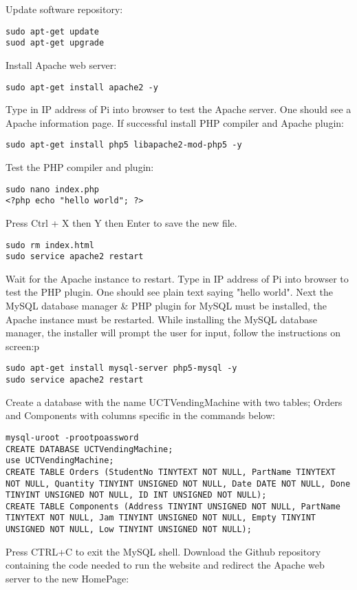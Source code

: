 \documentclass[a4paper,11pt]{article}
\numberwithin{figure}{section}
\numberwithin{table}{section}
\begin{document}
\begin{appendices}
Update software repository:
\begin{lstlisting}
sudo apt-get update
suod apt-get upgrade
\end{lstlisting}
Install Apache web server:
\begin{lstlisting}[firstnumber=3]
sudo apt-get install apache2 -y
\end{lstlisting}
Type in IP address of Pi into browser to test the Apache server. One should see a Apache information page. If successful install PHP compiler and Apache plugin:
\begin{lstlisting}[firstnumber=4]
sudo apt-get install php5 libapache2-mod-php5 -y
\end{lstlisting}
Test the PHP compiler and plugin:
\begin{lstlisting}[firstnumber=5]
sudo nano index.php
<?php echo "hello world"; ?>
\end{lstlisting}
Press Ctrl + X then Y then Enter to save the new file.
\begin{lstlisting}[firstnumber=7]
sudo rm index.html
sudo service apache2 restart
\end{lstlisting}
Wait for the Apache instance to restart. Type in IP address of Pi into browser to test the PHP plugin. One should see plain text saying "hello world". Next the MySQL database manager \& PHP plugin for MySQL must be installed, the Apache instance must be restarted. While installing the MySQL database manager, the installer will prompt the user for input, follow the instructions on screen:p
\begin{lstlisting}[firstnumber=9]
sudo apt-get install mysql-server php5-mysql -y
sudo service apache2 restart
\end{lstlisting}
Create a database with the name UCTVendingMachine with two tables; Orders and Components with columns specific in the commands below:
\begin{lstlisting}[firstnumber=11]
mysql-uroot -prootpoassword
CREATE DATABASE UCTVendingMachine;
use UCTVendingMachine;
CREATE TABLE Orders (StudentNo TINYTEXT NOT NULL, PartName TINYTEXT NOT NULL, Quantity TINYINT UNSIGNED NOT NULL, Date DATE NOT NULL, Done TINYINT UNSIGNED NOT NULL, ID INT UNSIGNED NOT NULL);
CREATE TABLE Components (Address TINYINT UNSIGNED NOT NULL, PartName TINYTEXT NOT NULL, Jam TINYINT UNSIGNED NOT NULL, Empty TINYINT UNSIGNED NOT NULL, Low TINYINT UNSIGNED NOT NULL);
\end{lstlisting}
Press CTRL+C to exit the MySQL shell. Download the Github repository containing the code needed to run the website and redirect the Apache web server to the new HomePage:

\end{appendices}
\end{document}
